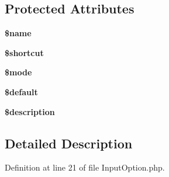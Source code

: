\subsection*{Protected Attributes}
\begin{DoxyCompactItemize}
\item 
\hypertarget{class_symfony_1_1_components_1_1_console_1_1_input_1_1_input_option_ab2fc40d43824ea3e1ce5d86dee0d763b}{
{\bfseries \$name}}
\label{class_symfony_1_1_components_1_1_console_1_1_input_1_1_input_option_ab2fc40d43824ea3e1ce5d86dee0d763b}

\item 
\hypertarget{class_symfony_1_1_components_1_1_console_1_1_input_1_1_input_option_a6ad2c8bece574efa00404e7bcf398f5a}{
{\bfseries \$shortcut}}
\label{class_symfony_1_1_components_1_1_console_1_1_input_1_1_input_option_a6ad2c8bece574efa00404e7bcf398f5a}

\item 
\hypertarget{class_symfony_1_1_components_1_1_console_1_1_input_1_1_input_option_a3aaf40baac36e278c7d7c9139df1750c}{
{\bfseries \$mode}}
\label{class_symfony_1_1_components_1_1_console_1_1_input_1_1_input_option_a3aaf40baac36e278c7d7c9139df1750c}

\item 
\hypertarget{class_symfony_1_1_components_1_1_console_1_1_input_1_1_input_option_a9df479534ecf05fd7575c6275d381687}{
{\bfseries \$default}}
\label{class_symfony_1_1_components_1_1_console_1_1_input_1_1_input_option_a9df479534ecf05fd7575c6275d381687}

\item 
\hypertarget{class_symfony_1_1_components_1_1_console_1_1_input_1_1_input_option_a87b032cba06009e3467abf1c8018d960}{
{\bfseries \$description}}
\label{class_symfony_1_1_components_1_1_console_1_1_input_1_1_input_option_a87b032cba06009e3467abf1c8018d960}

\end{DoxyCompactItemize}


\subsection{Detailed Description}


Definition at line 21 of file InputOption.php.



